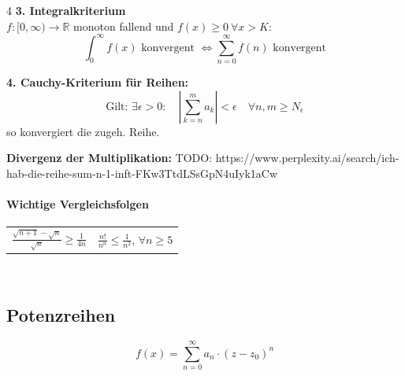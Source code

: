 \documentclass[6pt,a4paper]{scrartcl}
\begin{document}
\begin{multicols*}{4}
    \textbf{3. Integralkriterium}\\
    $f: [0, \infty) \rightarrow \mathbb R$ monoton fallend und $f(x) \ge 0 \ \forall x > K$: \\
    \[
        \int_{0}^{\infty}f(x) \text{ konvergent } \Leftrightarrow \sum_{n=0}^{\infty}f(n) \text{ konvergent}
    \]
    

    \textbf{4. Cauchy-Kriterium für Reihen:}
    \[
        \text{Gilt: } \exists \epsilon > 0: \quad \left|\sum_{k=n}^{m}a_k\right| < \epsilon \quad \forall n,m \ge N_\epsilon
    \]
    so konvergiert die zugeh. Reihe.

    \textbf{Divergenz der Multiplikation:}
    TODO: https://www.perplexity.ai/search/ich-hab-die-reihe-sum-n-1-inft-FKw3TtdLSsGpN4uIyk1aCw


    \begin{sectionbox}
        \vspace{-3mm}
        \paragraph{Wichtige Vergleichsfolgen\\}
        \begin{tabular}{l|l}
            $\frac{\sqrt{n+1}-\sqrt{n}}{\sqrt{n}} \ge \frac{1}{4n}$ & $\frac{n!}{n^n}\le \frac{1}{n^2}$, $\forall n \ge 5$
        \end{tabular}
        \\
    \end{sectionbox}

    \subsection{Potenzreihen} %
    \begin{equation*}
        f(x)=\sum_{n=0}^\infty a_n \cdot (z-z_0)^n
    \end{equation*}

\end{multicols*}
\end{document}
